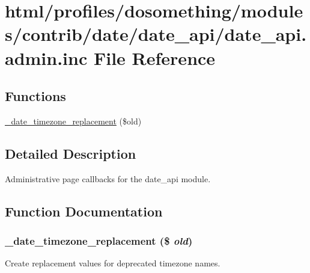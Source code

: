 \hypertarget{date__api_8admin_8inc}{
\section{html/profiles/dosomething/modules/contrib/date/date\_\-api/date\_\-api.admin.inc File Reference}
\label{date__api_8admin_8inc}
}
\subsection*{Functions}
\begin{DoxyCompactItemize}
\item 
\hyperlink{date__api_8admin_8inc_a4e09c5351db60f57720918d53eb54f5c}{\_\-date\_\-timezone\_\-replacement} (\$old)
\end{DoxyCompactItemize}


\subsection{Detailed Description}
Administrative page callbacks for the date\_\-api module. 

\subsection{Function Documentation}
\hypertarget{date__api_8admin_8inc_a4e09c5351db60f57720918d53eb54f5c}{
\subsubsection[{\_\-date\_\-timezone\_\-replacement}]{\setlength{\rightskip}{0pt plus 5cm}\_\-date\_\-timezone\_\-replacement (\$ {\em old})}}
\label{date__api_8admin_8inc_a4e09c5351db60f57720918d53eb54f5c}
Create replacement values for deprecated timezone names. 